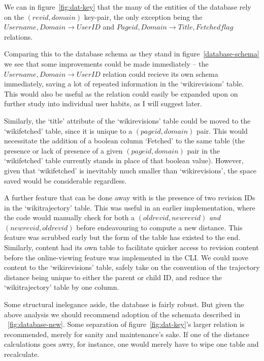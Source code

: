 We can in figure~\ref{fig:dat-key} that the many of the entities of
the database rely on the $(revid, domain)$ key-pair, the only
exception being the $Username, Domain \rightarrow UserID$ and $Pageid,
Domain \rightarrow Title, Fetched flag$ relations. 

Comparing this to the database schema as they stand in
figure~\ref{database-schema} we see that some improvements could be
made immediately -- the $Username, Domain \rightarrow UserID$ relation
could recieve its own schema immediately, saving a lot of repeated
information in the `wikirevisions' table. This would also be useful as
the relation could easily be expanded upon on further study into
individual user habits, as I will suggest later.

Similarly, the `title' attribute of the `wikirevisions' table could be
moved to the `wikifetched' table, since it is unique to a
$(pageid,domain)$ pair. This would necessitate the addition of a
boolean column `Fetched' to the same table (the presence or lack of
presence of a given $(pageid,domain)$ pair in the `wikifetched' table
currently stands in place of that boolean value). However, given that
`wikifetched' is inevitably much smaller than `wikirevisions', the
space saved would be considerable regardless.

A further feature that can be done away with is the presence of two
revision IDs in the `wikitrajectory' table. This was useful in an
earlier implementation, where the code would manually check for both a
$(oldrevid,newrevid)$ \textit{and} $(newrevid,oldrevid)$ before
endeavouring to compute a new distance. This feature was scrubbed
early but the form of the table has existed to the end. Similarly,
content had its own table to facilitate quicker access to revision
content before the online-viewing feature was implemented in the
CLI. We could move content to the `wikirevisions' table, safely take
on the convention of the trajectory distance being unique to either
the parent or child ID, and reduce the `wikitrajectory' table by one
column.

Some structural inelegance aside, the database is fairly robust. But
given the above analysis we should recommend adoption of the schemata
described in ~\ref{fig:database-new}. Some separation of
figure~\ref{fig:dat-key}'s larger relation is recommended, merely for
sanity and maintenance's sake. If one of the distance calculations
goes awry, for instance, one would merely have to wipe one table and
recalculate.

